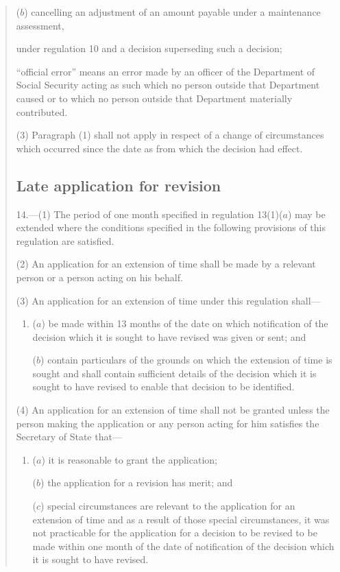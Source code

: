 \documentclass[12pt,a4paper]{article}
\begin{document}
\begin{quotation}
\begin{enumerate}
\begin{enumerate}
    ($b$)
    cancelling an adjustment of an amount payable under a maintenance assessment,
\end{enumerate}
    under regulation 10 and a decision superseding such a decision;

    “official error” means an error made by an officer of the Department of Social Security acting as such which no person outside that Department caused or to which no person outside that Department materially contributed. 
\end{enumerate}

(3) Paragraph (1) shall not apply in respect of a change of circumstances which occurred since the date as from which the decision had effect.

\subsection*{Late application for revision}

14.—(1) The period of one month specified in regulation 13(1)($a$) may be extended where the conditions specified in the following provisions of this regulation are satisfied.

(2) An application for an extension of time shall be made by a relevant person or a person acting on his behalf.

(3) An application for an extension of time under this regulation shall—
\begin{enumerate}\item[]
($a$) be made within 13 months of the date on which notification of the decision which it is sought to have revised was given or sent; and

($b$) contain particulars of the grounds on which the extension of time is sought and shall contain sufficient details of the decision which it is sought to have revised to enable that decision to be identified.
\end{enumerate}

(4) An application for an extension of time shall not be granted unless the person making the application or any person acting for him satisfies the Secretary of State that—
\begin{enumerate}\item[]
($a$) it is reasonable to grant the application;

($b$) the application for a revision has merit; and

($c$) special circumstances are relevant to the application for an extension of time and as a result of those special circumstances, it was not practicable for the application for a decision to be revised to be made within one month of the date of notification of the decision which it is sought to have revised.
\end{enumerate}


\end{quotation}
\end{document}
